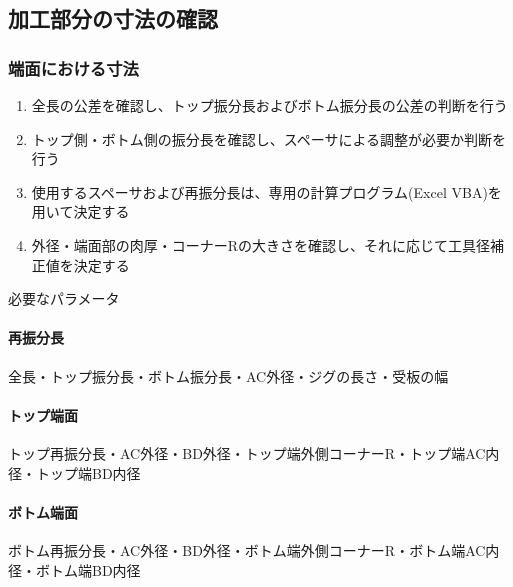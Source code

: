 \subsection{加工部分の寸法の確認}

\subsubsection{端面における寸法}
\begin{enumerate}
\item {}全長の公差を確認し、トップ振分長およびボトム振分長の公差の判断を行う
\item トップ側・ボトム側の振分長を確認し、スペーサによる調整が必要か判断を行う
\item 使用するスペーサおよび再振分長は、専用の計算プログラム(Excel VBA)を用いて決定する
\item {}外径・端面部の肉厚・コーナーRの大きさを確認し、それに応じて工具径補正値を決定する
\end{enumerate}
\begin{Parameter}{必要なパラメータ}
\paragraph*{再振分長}
全長・トップ振分長・ボトム振分長・AC外径・ジグの長さ・受板の幅
\tcbline*
\paragraph*{トップ端面}
トップ再振分長・AC外径・BD外径・トップ端外側コーナーR・トップ端AC内径・トップ端BD内径
\tcbline*
\paragraph*{ボトム端面}
ボトム再振分長・AC外径・BD外径・ボトム端外側コーナーR・ボトム端AC内径・ボトム端BD内径
\end{Parameter}

